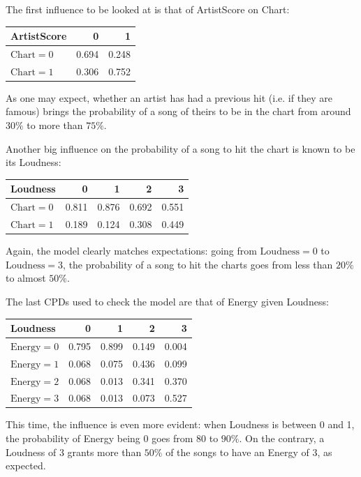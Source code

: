 \documentclass[a4paper, 12pt]{article}
\begin{document}
The first influence to be looked at is that of ArtistScore on Chart:
\begin{center}
    \begin{tabular}{lrr}
        \toprule
        ArtistScore          & 0     & 1        \\ 
        \midrule
        $\mathrm{Chart} = 0$ & 0.694 & 0.248    \\ 
        $\mathrm{Chart} = 1$ & 0.306 & 0.752    \\ 
        \bottomrule
    \end{tabular}
\end{center}
As one may expect, whether an artist has had a previous hit (i.e. if they are famous) brings the probability of a song of theirs to be in the chart from around $30\%$ to more than $75\%$.

Another big influence on the probability of a song to hit the chart is known to be its Loudness:
\begin{center}
    \begin{tabular}{lrrrr}
        \toprule
        Loudness             & 0     & 1     & 2     & 3     \\
        \midrule
        $\mathrm{Chart} = 0$ & 0.811 & 0.876 & 0.692 & 0.551 \\
        $\mathrm{Chart} = 1$ & 0.189 & 0.124 & 0.308 & 0.449 \\
        \bottomrule
    \end{tabular}
\end{center}
Again, the model clearly matches expectations: going from $\mathrm{Loudness} = 0$ to $\mathrm{Loudness} = 3$, the probability of a song to hit the charts goes from less than $20\%$ to almost $50\%$.

The last CPDs used to check the model are that of Energy given Loudness:
\begin{center}
    \begin{tabular}{lrrrr}
        \toprule
        Loudness                & 0     & 1     & 2     & 3     \\
        \midrule
        $\mathrm{Energy} = 0$   & 0.795 & 0.899 & 0.149 & 0.004 \\
        $\mathrm{Energy} = 1$   & 0.068 & 0.075 & 0.436 & 0.099 \\
        $\mathrm{Energy} = 2$   & 0.068 & 0.013 & 0.341 & 0.370 \\
        $\mathrm{Energy} = 3$   & 0.068 & 0.013 & 0.073 & 0.527 \\
        \bottomrule
    \end{tabular}
\end{center}
This time, the influence is even more evident: when Loudness is between 0 and 1, the probability of Energy being 0 goes from 80 to $90\%$. On the contrary, a Loudness of 3 grants more than $50\%$ of the songs to have an Energy of 3, as expected.
\end{document}
